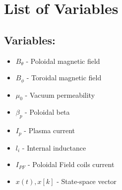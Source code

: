 \chapter*{List of Variables}
\begin{multicols}{2}
\section*{Variables:}
\begin{itemize}
\item $B_{\theta}$ - Poloidal magnetic field
\item $B_{\phi}$ - Toroidal magnetic field
\item $\mu_0$ - Vacuum permeability
\item $\beta_p$ - Poloidal beta
\item $I_p$ - Plasma current
\item $l_i$ - Internal inductance
\item $I_{PF}$ - Poloidal Field coils current
\item $x(t),x[k]$ - State-space vector
\end{itemize}

\end{multicols}